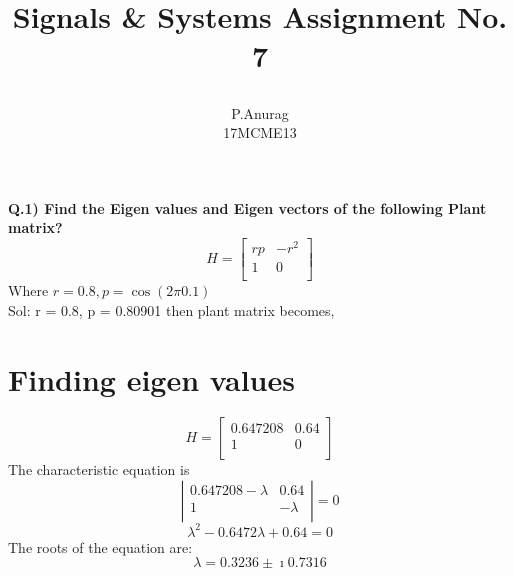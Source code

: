 \documentclass[a4paper,10pt]{article}
\title{
  \begin{large}
    Signals \& Systems
    Assignment No. 7
  \end{large}
}
\author{P.Anurag\\ 17MCME13}
\begin{document}
\maketitle
  \large{\bf{Q.1) Find the Eigen values and Eigen vectors of the following Plant matrix?}}
  \[
  H = 
    \left[
      \begin{array}{cc}
        rp  & -r^2\\
        1  &  0 \\
      \end{array}
    \right]
  \]
  Where $r = 0.8, p = \cos(2\pi0.1)$\\
  \large{Sol:} r = 0.8, p = 0.80901 then plant matrix becomes,
  \section{Finding eigen values}
  \[
  H = 
    \left[
      \begin{array}{cc}
        0.647208  & 0.64\\
        1  &  0 \\
      \end{array}
    \right]
  \]
  The characteristic equation is
  \[
    \left|
      \begin{array}{cc}
        0.647208-\lambda  & 0.64\\
        1  &  -\lambda \\
      \end{array}
    \right| = 0
  \]
  \begin{equation}
    \lambda^2 - 0.6472\lambda + 0.64 = 0   
  \end{equation}
  The roots of the equation are:\\
 \[ \lambda = 0.3236\pm\imath0.7316\]
\end{document}

